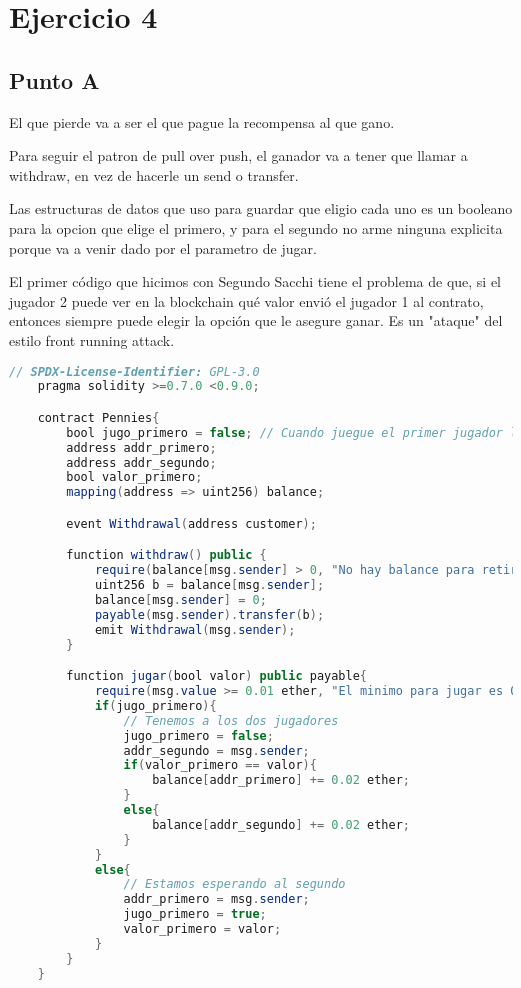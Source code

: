 \documentclass[12pt]{article}
\begin{document}
\section*{Ejercicio 4}
\subsection*{Punto A}
El que pierde va a ser el que pague la recompensa al que gano. 

Para seguir el patron de pull over push, el ganador va a tener que llamar a withdraw, en vez de hacerle un send o transfer. 

Las estructuras de datos que uso para guardar que eligio cada uno es un booleano para la opcion que elige el primero, y para el segundo no arme ninguna explicita porque va a venir dado por el parametro de jugar.

El primer código que hicimos con Segundo Sacchi tiene el problema de que, si el jugador 2 puede ver en la blockchain qué valor envió el jugador 1 al contrato, entonces siempre puede elegir la opción que le asegure ganar. Es un "ataque" del estilo front running attack. 

\begin{lstlisting}[language=Java]
    // SPDX-License-Identifier: GPL-3.0
    pragma solidity >=0.7.0 <0.9.0;

    contract Pennies{
        bool jugo_primero = false; // Cuando juegue el primer jugador lo pongo en True, cuando juegue el segundo lo pongo en False 
        address addr_primero;
        address addr_segundo; 
        bool valor_primero;
        mapping(address => uint256) balance; 

        event Withdrawal(address customer);

        function withdraw() public {
            require(balance[msg.sender] > 0, "No hay balance para retirar");
            uint256 b = balance[msg.sender];
            balance[msg.sender] = 0;
            payable(msg.sender).transfer(b);
            emit Withdrawal(msg.sender);
        }

        function jugar(bool valor) public payable{
            require(msg.value >= 0.01 ether, "El minimo para jugar es 0,01 eth"); // Si manda mas se lo queda la casa como donacion
            if(jugo_primero){
                // Tenemos a los dos jugadores
                jugo_primero = false; 
                addr_segundo = msg.sender; 
                if(valor_primero == valor){
                    balance[addr_primero] += 0.02 ether;  
                }
                else{
                    balance[addr_segundo] += 0.02 ether;
                }
            }
            else{
                // Estamos esperando al segundo 
                addr_primero = msg.sender;
                jugo_primero = true;
                valor_primero = valor;
            }
        }
    }
\end{lstlisting}
\end{document}
